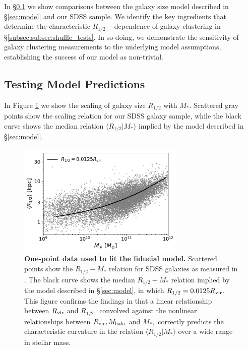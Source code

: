 \documentclass[usenatbib,usegraphicx,letterpaper]{mn2e}
\newcommand{\rhalf}{R_{1/2}}
\newcommand{\mstar}{M_{\ast}}
\newcommand{\mhalo}{M_{\rm halo}}
\newcommand{\rvir}{R_{\rm vir}}
\begin{document}
In \S\ref{subsec:predictions} we show comparisons between the galaxy size model described in \S\ref{sec:model} and our SDSS sample. We identify the key ingredients that determine the characteristic $\rhalf-$dependence of galaxy clustering in \S\ref{subsec:subsec:shuffle_tests}. In so doing, we demonstrate the sensitivity of galaxy clustering measurements to the underlying model assumptions, establishing the success of our model as non-trivial. 

\subsection{Testing Model Predictions}
\label{subsec:predictions}

In Figure \ref{fig:scatter_plot} we show the scaling of galaxy size $\rhalf$ with $\mstar.$ Scattered gray points show the scaling relation for our SDSS galaxy sample, while the black curve shows the median relation $\langle\rhalf\vert\mstar\rangle$ implied by the model described in \S\ref{sec:model}.

\begin{figure}
\centering
\includegraphics[width=8cm]{FIGS/single_component_model_vs_sdss_one_point.pdf}
\caption{
{\bf One-point data used to fit the fiducial model.}
Scattered points show the $\rhalf-\mstar$ relation for SDSS galaxies as measured in \citet{meert_etal15}. The black curve shows the median $\rhalf-\mstar$ relation implied by the model described in \S\ref{sec:model}, in which $\rhalf=0.0125\rvir.$ This figure confirms the findings in \citet{kravtsov13} that a linear relationship between $\rvir$ and $\rhalf,$ convolved against the nonlinear relationships between $\rvir, \mhalo$ and $\mstar,$ correctly predicts the characteristic curvature in the relation $\langle\rhalf\vert\mstar\rangle$ over a wide range in stellar mass.
}
\label{fig:scatter_plot}
\end{figure}
\end{document}
